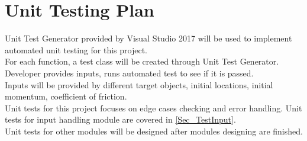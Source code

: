 \documentclass[12pt, titlepage]{article}
\begin{document}



					
					
					
					
					

					
					
					
					



				
\section{Unit Testing Plan}
\label{Sec_UnitTest}
Unit Test Generator provided by Visual Studio 2017 will be used to implement automated unit testing for this project.\\
For each function, a test class will be created through Unit Test Generator. Developer provides inputs, runs automated test to see if it is passed.\\
Inputs will be provided by different target objects, initial locations, initial momentum, coefficient of friction. \\
Unit tests for this project focuses on edge cases checking and error handling. Unit tests for input handling module are covered in \ref{Sec_TestInput}.\\ 
Unit tests for other modules will be designed after modules designing are finished.
\end{document}
